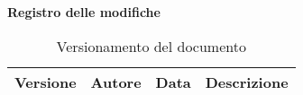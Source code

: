 \documentclass[12pt,a4paper]{article}
\begin{document}
\Large{\textbf{Registro delle modifiche}}\\
\normalsize

\begin{table}[h]
\begin{center}

\begin{tabular}{p{} p{} p{} p{}}
\toprule
\textbf{Versione} & \textbf{Autore} & \textbf{Data} & \textbf{Descrizione}\\
\midrule
\midrule

\bottomrule
\end{tabular}
\caption{Versionamento del documento}
\label{tabVers1}
\end{center}
\end{table}
\newpage

\tableofcontents
\listoftables
\newpage
\end{document}
